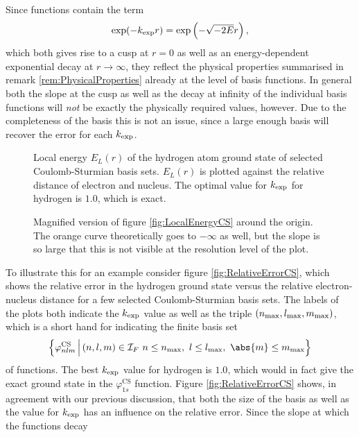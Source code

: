 \noindent
Since \CS functions contain the term
\[ \exp(-k_\text{exp} r) = \exp\left( - \sqrt{-2E}r \right), \]
which both gives rise to a cusp at $r=0$ as well as
an energy-dependent exponential decay at $r\to\infty$,
they reflect the physical properties summarised in remark \vref{rem:PhysicalProperties}
already at the level of basis functions.
In general both the slope at the cusp as well as the decay at infinity
of the individual basis functions will \emph{not} be exactly the physically
required values, however.
Due to the completeness of the \CS basis
this is not an issue, since a large enough basis will recover the error
for each $k_\text{exp}$.%
%
\begin{figure}[p]
	\centering
	\caption[Local energy of the hydrogen ground state for {\CS} bases]{
		Local energy $E_L(r)$ of the hydrogen atom ground state
		of selected Coulomb-Sturmian basis sets.
		$E_L(r)$ is plotted against the relative distance
		of electron and nucleus.
		The optimal value for $k_\text{exp}$ for hydrogen is $1.0$,
		which is exact.
	}
	\label{fig:LocalEnergyCS}
\end{figure}
%
\begin{figure}[p]
	\centering
	\caption[Local energy of the hydrogen ground state for {\cGTO}s (magnified)]{
		Magnified version of figure \vref{fig:LocalEnergyCS}
		around the origin.
		The orange curve theoretically goes to $-\infty$ as well,
		but the slope is so large that this is not visible
		at the resolution level of the plot.
	}
	\label{fig:LocalEnergyCSZoom}
\end{figure}
%
To illustrate this for an example consider figure \vref{fig:RelativeErrorCS},
which shows the relative error in the hydrogen ground state
versus the relative electron-nucleus distance
for a few selected Coulomb-Sturmian basis sets.
The labels of the plots both indicate the $k_\text{exp}$ value as well as the
triple  $(n_\text{max}, l_\text{max}, m_\text{max})$, which is a short hand for indicating
the finite basis set
\[ \left\{ \varphi^\text{CS}_{nlm} \, \Big| \, (n,l,m) \in \Itpf \
	n \leq \nmax, \ l \leq \lmax, \ \abs{m} \leq \mmax \right\} \]
of \CS functions.
The best $k_\text{exp}$ value for hydrogen is $1.0$,
which would in fact give the exact ground state in the $\varphi^\text{CS}_{1s}$ function.
Figure \vref{fig:RelativeErrorCS} shows, in agreement with our previous discussion,
that both the size of the basis as well as the value for $k_\text{exp}$ has an influence
on the relative error.
Since the slope at which the \CS functions decay
